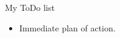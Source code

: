 \documentclass[12pt]{article}
\begin{document}
My ToDo list

\begin{itemize}
  \item Immediate plan of action.


\end{itemize}
\end{document}
